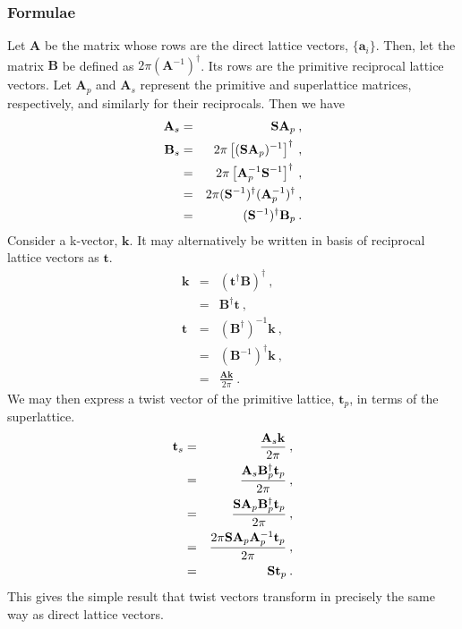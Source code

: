 \subsubsection{Formulae}
\newcommand{\Amat}{\mathbf{A}} 
\newcommand{\Bmat}{\mathbf{B}} 
\renewcommand{\vk}{\mathbf{k}}
\newcommand{\vt}{\mathbf{t}}

Let $\Amat$ be the matrix whose rows are the direct lattice vectors,
$\{\mathbf{a}_i\}$.  Then, let the matrix $\Bmat$ be defined as
$2\pi(\Amat^{-1})^\dagger$.  Its rows are the primitive reciprocal
lattice vectors.  Let $\Amat_p$ and $\Amat_s$ represent the primitive
and superlattice matrices, respectively, and similarly for their
reciprocals.  Then we have
\begin{eqnarray}
\Amat_s & = & \Smat \Amat_p\:, \\
\Bmat_s & = & 2\pi\left[(\Smat \Amat_p)^{-1}\right]^\dagger\:, \\
        & = & 2\pi\left[\Amat_p^{-1} \Smat^{-1}\right]^\dagger\:, \\
        & = & 2\pi(\Smat^{-1})^\dagger (\Amat_p^{-1})^\dagger\:, \\
        & = & (\Smat^{-1})^\dagger \Bmat_p\:.
\end{eqnarray}  
Consider a k-vector, $\vk$.  It may alternatively be written in
basis of reciprocal lattice vectors as $\vt$.  
\begin{eqnarray}
\vk & = & (\vt^\dagger \Bmat)^\dagger\:, \\
    & = & \Bmat^\dagger \vt\:,           \\
\vt & = & (\Bmat^\dagger)^{-1} \vk\:,    \\
    & = & (\Bmat^{-1})^\dagger \vk\:,    \\
    & = & \frac{\Amat \vk}{2\pi}\:.
\end{eqnarray}
We may then express a twist vector of the primitive lattice, $\vt_p$, in terms
of the superlattice.
\begin{eqnarray}
\vt_s & = & \frac{\Amat_s \vk}{2\pi}\:,                           \\
      & = & \frac{\Amat_s \Bmat_p^\dagger \vt_p}{2\pi}\:,         \\
      & = & \frac{\Smat \Amat_p \Bmat_p^\dagger \vt_p}{2\pi}\:,   \\
      & = & \frac{2\pi \Smat \Amat_p \Amat_p^{-1} \vt_p}{2\pi}\:, \\
      & = & \Smat \vt_p\:.
\end{eqnarray}
This gives the simple result that twist vectors transform in precisely
the same way as direct lattice vectors.


